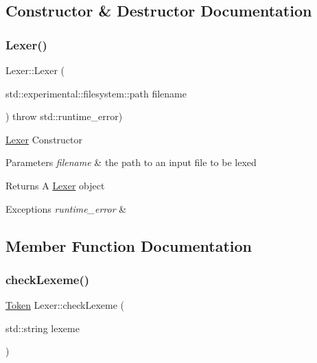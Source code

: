 \subsection{Constructor \& Destructor Documentation}
\hypertarget{class_lexer_a41a25e738dff5c31caf442990709adde}{}\label{class_lexer_a41a25e738dff5c31caf442990709adde} 
\subsubsection{\texorpdfstring{Lexer()}{Lexer()}}
{\footnotesize\ttfamily Lexer\+::\+Lexer (\begin{DoxyParamCaption}\item[{std\+::experimental\+::filesystem\+::path}]{filename }\end{DoxyParamCaption}) throw  std\+::runtime\+\_\+error) }

\hyperlink{class_lexer}{Lexer} Constructor 
\begin{DoxyParams}{Parameters}
{\em filename} & the path to an input file to be lexed \\
\hline
\end{DoxyParams}
\begin{DoxyReturn}{Returns}
A \hyperlink{class_lexer}{Lexer} object 
\end{DoxyReturn}

\begin{DoxyExceptions}{Exceptions}
{\em runtime\+\_\+error} & \\
\hline
\end{DoxyExceptions}


\subsection{Member Function Documentation}
\hypertarget{class_lexer_a50bcd81726a049971e16c4a6e8223604}{}\label{class_lexer_a50bcd81726a049971e16c4a6e8223604} 
\subsubsection{\texorpdfstring{check\+Lexeme()}{checkLexeme()}}
{\footnotesize\ttfamily \hyperlink{_lexer_8h_a6a9e93b081bad7fc74c17306fb168c1f}{Token} Lexer\+::check\+Lexeme (\begin{DoxyParamCaption}\item[{std\+::string}]{lexeme }\end{DoxyParamCaption})\hspace{0.3cm}{\ttfamily [private]}}

